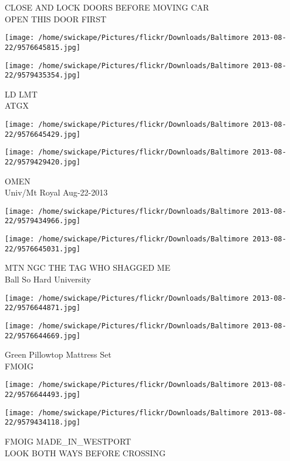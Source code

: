 \documentclass[10pt,letterpaper]{article}
\begin{document}
CLOSE AND LOCK DOORS BEFORE MOVING CAR\\
OPEN THIS DOOR FIRST
\pagebreak

\texttt{[image: /home/swickape/Pictures/flickr/Downloads/Baltimore 2013-08-22/9576645815.jpg]}

\vspace{0.25in}
\texttt{[image: /home/swickape/Pictures/flickr/Downloads/Baltimore 2013-08-22/9579435354.jpg]}

LD LMT\\
ATGX
\pagebreak

\texttt{[image: /home/swickape/Pictures/flickr/Downloads/Baltimore 2013-08-22/9576645429.jpg]}

\vspace{0.25in}
\texttt{[image: /home/swickape/Pictures/flickr/Downloads/Baltimore 2013-08-22/9579429420.jpg]}

OMEN\\
Univ/Mt Royal Aug{-}22{-}2013
\pagebreak

\texttt{[image: /home/swickape/Pictures/flickr/Downloads/Baltimore 2013-08-22/9579434966.jpg]}

\vspace{0.25in}
\texttt{[image: /home/swickape/Pictures/flickr/Downloads/Baltimore 2013-08-22/9576645031.jpg]}

MTN NGC THE TAG WHO SHAGGED ME\\
Ball So Hard University
\pagebreak

\texttt{[image: /home/swickape/Pictures/flickr/Downloads/Baltimore 2013-08-22/9576644871.jpg]}

\vspace{0.25in}
\texttt{[image: /home/swickape/Pictures/flickr/Downloads/Baltimore 2013-08-22/9576644669.jpg]}

Green Pillowtop Mattress Set\\
FMOIG
\pagebreak

\texttt{[image: /home/swickape/Pictures/flickr/Downloads/Baltimore 2013-08-22/9576644493.jpg]}

\vspace{0.25in}
\texttt{[image: /home/swickape/Pictures/flickr/Downloads/Baltimore 2013-08-22/9579434118.jpg]}

FMOIG MADE\_IN\_WESTPORT\\
LOOK BOTH WAYS BEFORE CROSSING
\pagebreak
\end{document}
